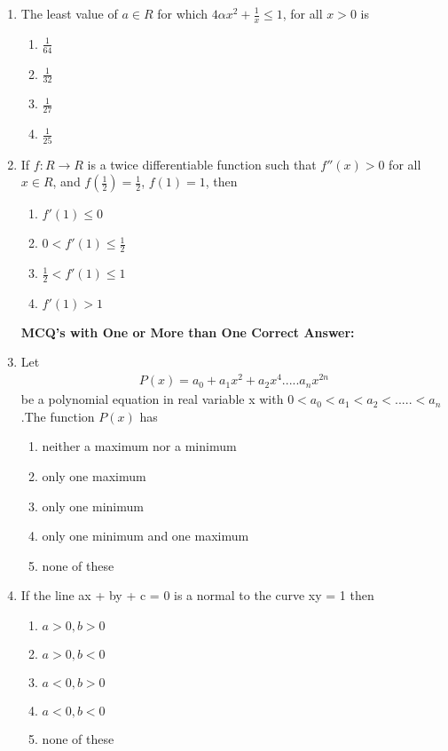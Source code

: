 \begin{enumerate}[label=\arabic*.,ref=\thesubsection.\theenumi]
\item The least value of $a \in R$ for which $4\alpha x^2 + \frac{1}{x} \leq 1$, for all $x > 0$ is
\begin{enumerate}
\item $\frac{1}{64}$
\item $\frac{1}{32}$
\item $\frac{1}{27}$
\item $\frac{1}{25}$
\end{enumerate}

\item If $f: R \to R$ is a twice differentiable function such that $f''(x) > 0$ for all $x \in R$, and 
$f(\frac{1}{2}) = \frac{1}{2}$, $f(1) = 1$, then
\begin{enumerate}
\item $f'(1) \leq 0$
\item $0 < f'(1) \leq \frac{1}{2}$
\item $\frac{1}{2} < f'(1) \leq 1$
\item $f'(1) > 1$
\end{enumerate}

\textbf{MCQ's with One or More than One Correct Answer:}

\item Let 
\begin{align*}
P(x) = a_0 + a_1x^2 + a_2x^4.....a_nx^{2n}
\end{align*}
 be a polynomial equation in real variable x with 
$0 < a_0 < a_1 < a_2 < ..... < a_n$.The function $P(x)$ has
\begin{enumerate}
\item neither a maximum nor a minimum 
\item only one maximum 
\item only one minimum 
\item only one minimum and one maximum
\item none of these
\end{enumerate}

\item If the line ax + by + c = 0 is a normal to the curve xy = 1 then 
\begin{enumerate}
\item $a > 0, b > 0$
\item $a > 0, b < 0$
\item $a < 0, b > 0$
\item $a < 0, b < 0$
\item none of these
\end{enumerate}


\end{enumerate}
